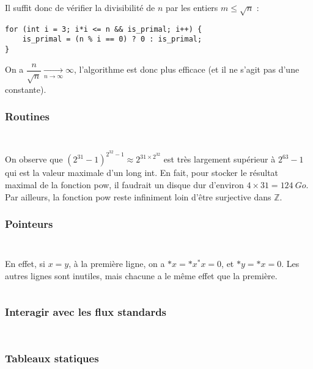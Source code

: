 \documentclass[../main.tex]{subfiles}
\begin{document}
Il suffit donc de vérifier la divisibilité de $n$ par les entiers $m\leq{\sqrt{n}}$ :
\begin{verbatim}
for (int i = 3; i*i <= n && is_primal; i++) {
	is_primal = (n % i == 0) ? 0 : is_primal;
}
\end{verbatim}
On a $\dfrac{n}{\sqrt{n}}\underset{n\rightarrow{\infty}}{\rightarrow}\infty$, l'algorithme est donc plus efficace (et il ne s'agit pas d'une constante).
\subsubsection{Routines}
\inputminted{c}{solutions/suite_fibonacci_2.c}
\inputminted{c}{solutions/int_pow.c}
On observe que $(2^{31}-1)^{2^{32}-1}\approx{2^{31\times{2^{32}}}}$ est très largement supérieur à $2^{63} - 1$ qui est la valeur maximale d'un \textsf{long int}. En fait, pour stocker le résultat maximal de la fonction \textsf{pow}, il faudrait un disque dur d'environ $4\times{31} = 124\ Go$. Par ailleurs, la fonction \textsf{pow} reste infiniment loin d'être surjective dans $\mathbb{Z}$.
\subsubsection{Pointeurs}
\inputminted{c}{solutions/become_bot.c}
\inputminted{c}{solutions/inter_no_side_effect_3.c}
En effet, si $x = y$, à la première ligne, on a $*x = *x ^ *x = 0$, et $*y = *x = 0$. Les autres lignes sont inutiles, mais chacune a le même effet que la première.
 
\inputminted{c}{solutions/manhattan_dist.c}
\subsubsection{Interagir avec les flux standards}
\inputminted{c}{solutions/euclidian_dist.c}
\inputminted{c}{solutions/int_sum.c}
\subsubsection{Tableaux statiques}
\inputminted{c}{solutions/tab_display.c}
\inputminted{c}{solutions/tab_sum.c}
\inputminted{c}{solutions/tab_max_min.c}
\end{document}
